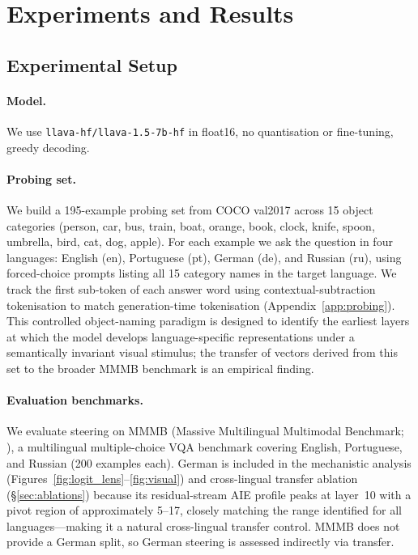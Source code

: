 \documentclass[11pt]{article}
\begin{document}
\section{Experiments and Results}
\label{sec:experiments}

\subsection{Experimental Setup}
\label{sec:setup}

\paragraph{Model.}
We use \texttt{llava-hf/llava-1.5-7b-hf} in float16, no quantisation or
fine-tuning, greedy decoding.

\paragraph{Probing set.}
We build a 195-example probing set from COCO val2017
\citep{lin-etal-2014-microsoft} across 15 object categories (person, car,
bus, train, boat, orange, book, clock, knife, spoon, umbrella, bird, cat,
dog, apple).
For each example we ask the question in four languages: English (en),
Portuguese (pt), German (de), and Russian (ru), using forced-choice prompts
listing all 15 category names in the target language.
We track the first sub-token of each answer word using contextual-subtraction
tokenisation to match generation-time tokenisation (Appendix~\ref{app:probing}).
This controlled object-naming paradigm is designed to identify the earliest
layers at which the model develops language-specific representations under a
semantically invariant visual stimulus; the transfer of vectors derived from
this set to the broader MMMB benchmark is an empirical finding.

\paragraph{Evaluation benchmarks.}
We evaluate steering on MMMB (Massive Multilingual Multimodal Benchmark;
\citealp{sun-etal-2023-mmmb}), a multilingual multiple-choice VQA benchmark
covering English, Portuguese, and Russian
(200 examples each).
German is included in the mechanistic analysis (Figures~\ref{fig:logit_lens}--\ref{fig:visual})
and cross-lingual transfer ablation (\S\ref{sec:ablations}) because its
residual-stream AIE profile peaks at layer~10 with a pivot region of
approximately 5--17, closely matching the range identified for all languages---making
it a natural cross-lingual transfer control.
MMMB does not provide a German split, so German steering is assessed indirectly via transfer.
\end{document}
